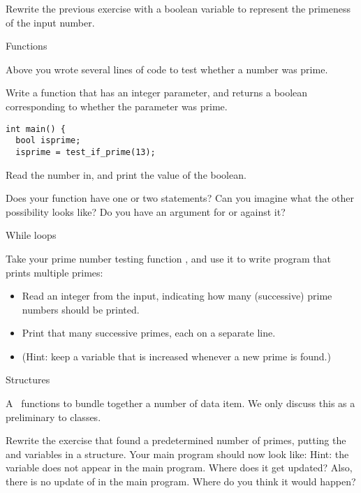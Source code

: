 \begin{exercise}
  \label{ex:prime:test2}
  Rewrite the previous exercise with a boolean variable to represent
  the primeness of the input number.
\end{exercise}

 {Functions}

\prerequisite{\ref{ch:function}}

Above you wrote several lines of code to test whether a number was
prime.

\begin{exercise}
  \label{ex:prime:func}
  Write a function  that has an integer parameter, and returns a boolean
  corresponding to whether the parameter was prime.
\begin{verbatim}
int main() {
  bool isprime;
  isprime = test_if_prime(13);
\end{verbatim}
  Read the number in, and print the value of the boolean.

  Does your function have one or two  statements?
  Can you imagine what the other possibility looks like?
  Do you have an argument for or against it?
\end{exercise}

 {While loops}

\prerequisite{\ref{sec:loopuntil}}

\begin{exercise}
  \label{ex:prime:while}
  Take your prime number testing function , and use it to
  write program that prints multiple primes:
  \begin{itemize}
  \item Read an integer  from the input, indicating how
    many (successive) prime numbers should be printed.
  \item Print that many successive primes, each on a separate line.
  \item (Hint: keep a variable
     that is increased whenever a new prime is found.)
  \end{itemize}
\end{exercise}

 {Structures}

\prerequisite{\ref{sec:struct}, \ref{sec:reference}}

A~ functions to bundle together a number of data item. We
only discuss this as a preliminary to classes.

\begin{exercise}
  \label{ex:prime:struct}
  Rewrite the exercise that found a predetermined number of primes,
  putting the  and
   variables in a structure. Your main program should
  now look like:
  Hint: the variable  does not appear in the
  main program. Where does it get updated? Also, there is no update of
   in the main program. Where do you think
  it would happen?
\end{exercise}

